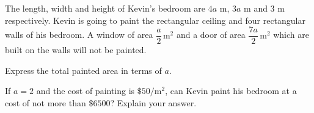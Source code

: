  The length, width and height of Kevin's bedroom are $4a$ m, $3a$ m and $3$ m respectively. Kevin is going to paint the rectangular ceiling and four rectangular walls of his bedroom. A window of area $\dfrac{a}{2}\,\text{m}^2$ and a door of area $\dfrac{7a}{2}\,\text{m}^2$ which are built on the walls will not be painted.

\begin{subparts}
  \item Express the total painted area in terms of $a$.
  \item If $a=2$ and the cost of painting is $\$50/\text{m}^2$, can Kevin paint his bedroom at a cost of not more than $\$6500$? Explain your answer.
\end{subparts}

